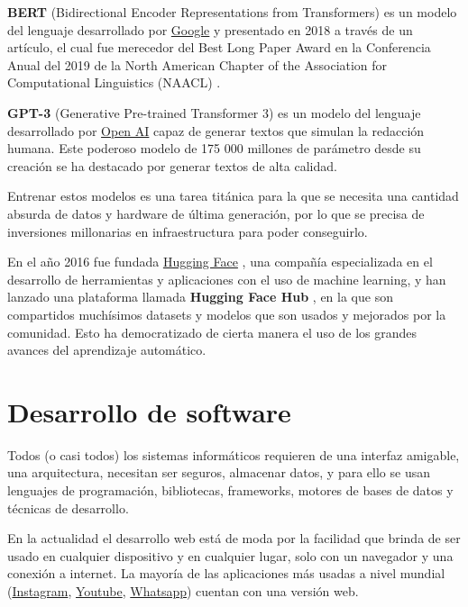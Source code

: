 \textbf{BERT} (Bidirectional Encoder Representations from Transformers) es un modelo del lenguaje desarrollado por \href{google.com}{Google} y presentado en 2018 a través de un artículo, el cual fue merecedor del Best Long Paper
Award en la Conferencia Anual del 2019 de la North American Chapter of the Association for Computational Linguistics (NAACL) \cite{bert_award}.
\newline

\textbf{GPT-3} (Generative Pre-trained Transformer 3) es un modelo del lenguaje desarrollado por \href{https://openai.com/}{Open AI} capaz de generar textos que simulan la redacción humana. Este poderoso modelo de 175 000 millones de parámetro desde su creación se ha destacado por generar textos de alta calidad.
\newline

Entrenar estos modelos es una tarea titánica para la que se necesita una cantidad absurda de datos y hardware de última generación, por lo que se precisa de inversiones millonarias en infraestructura para poder conseguirlo.
\newline

En el año 2016 fue fundada \href{https://huggingface.co/}{Hugging Face} \cite{hugging_face}, una compañía especializada en el desarrollo de herramientas y aplicaciones con el uso de machine learning, y han lanzado una plataforma llamada \textbf{Hugging Face Hub} \cite{hugging_face_hub}, en la que son compartidos muchísimos datasets y modelos que son usados y mejorados por la comunidad. Esto ha democratizado de cierta manera el uso de los grandes avances del aprendizaje automático.
\newline

\section{Desarrollo de software}

Todos (o casi todos) los sistemas informáticos requieren de una interfaz amigable, una arquitectura, necesitan ser seguros, almacenar datos, y para ello se usan lenguajes de programación, bibliotecas, frameworks, motores de bases de datos y técnicas de desarrollo.
\newline

En la actualidad el desarrollo web está de moda por la facilidad que brinda de ser usado en cualquier dispositivo y en cualquier lugar, solo con un navegador y una conexión a internet. La mayoría de las aplicaciones más usadas a nivel mundial (\href{instagram.com}{Instagram}, \href{youtube.com}{Youtube}, \href{https://web.whatsapp.com/}{Whatsapp}) cuentan con una versión web.
\newline

